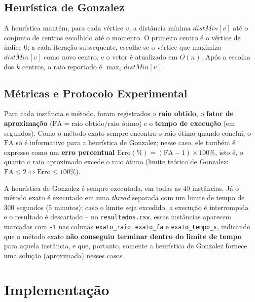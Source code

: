 \documentclass[10pt,twocolumn]{article}
\begin{document}
\subsection{Heur\'istica de Gonzalez}

A heur\'istica mant\'em, para cada v\'ertice $v$, a dist\^ancia m\'inima
$\mathit{distMin}[v]$ at\'e o conjunto de centros escolhido at\'e o momento. O primeiro
centro \'e o v\'ertice de \'indice $0$; a cada itera\c{c}\~ao subsequente, escolhe-se o
v\'ertice que maximiza $\mathit{distMin}[v]$ como novo centro, e o vetor \'e atualizado em
$O(n)$. Ap\'os a escolha dos $k$ centros, o raio reportado \'e
$\max_v \mathit{distMin}[v]$.

\subsection{M\'etricas e Protocolo Experimental}

Para cada inst\^ancia e m\'etodo, foram registrados o \textbf{raio obtido}, o
\textbf{fator de aproxima\c{c}\~ao} ($\mathrm{FA} = \text{raio obtido} / \text{raio
\'otimo}$) e o \textbf{tempo de execu\c{c}\~ao} (em segundos). Como o m\'etodo exato
sempre encontra o raio \'otimo quando conclui, o $\mathrm{FA}$ s\'o \'e informativo para
a heur\'istica de Gonzalez; nesse caso, ele tamb\'em \'e expresso como um
\textbf{erro percentual} $\mathrm{Erro}(\%) = (\mathrm{FA}-1)\times 100\%$, isto \'e, o
quanto o raio aproximado excede o raio \'otimo (limite te\'orico de Gonzalez:
$\mathrm{FA}\leq 2 \Leftrightarrow \mathrm{Erro}\leq 100\%$).

A heur\'istica de Gonzalez \'e sempre executada, em todas as 40 inst\^ancias. J\'a o
m\'etodo exato \'e executado em uma \emph{thread} separada com um limite de tempo de
$300$ segundos (5 minutos); caso o limite seja excedido, a execu\c{c}\~ao \'e
interrompida e o resultado \'e descartado -- no \texttt{resultados.csv}, essas
inst\^ancias aparecem marcadas com \texttt{-1} nas colunas \texttt{exato\_raio},
\texttt{exato\_fa} e \texttt{exato\_tempo\_s}, indicando que o m\'etodo exato
\textbf{n\~ao conseguiu terminar dentro do limite de tempo} para aquela inst\^ancia, e
que, portanto, somente a heur\'istica de Gonzalez fornece uma solu\c{c}\~ao
(aproximada) nesses casos.

\section{Implementa\c{c}\~ao}
\end{document}
